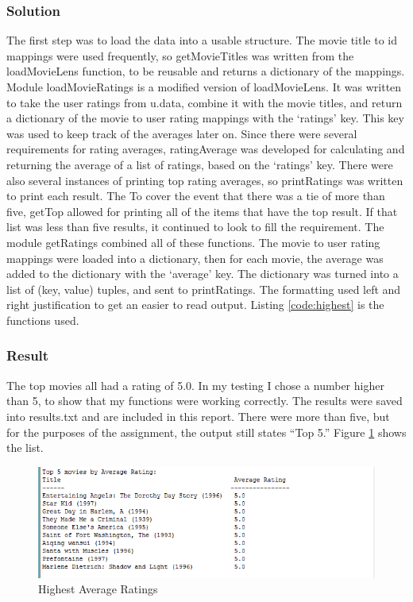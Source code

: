 \documentclass[paper=a4, fontsize=11pt]{scrartcl} %
\numberwithin{equation}{section} %
\numberwithin{figure}{section} %
\numberwithin{table}{section} %
\begin{document}
\subsubsection{Solution}
The first step was to load the data into a usable structure.
The movie title to id mappings were used frequently, so getMovieTitles was written from the loadMovieLens function, to be reusable and returns a dictionary of the mappings.
Module loadMovieRatings is a modified version of loadMovieLens.
It was written to take the user ratings from u.data, combine it with the movie titles, and return a dictionary of the movie to user rating mappings with the `ratings' key.\cite{bib:collective}
This key was used to keep track of the averages later on.
Since there were several requirements for rating averages, ratingAverage was developed for calculating and returning the average of a list of ratings, based on the `ratings' key.
There were also several instances of printing top rating averages, so printRatings was written to print each result.  
The 
To cover the event that there was a tie of more than five, getTop allowed for printing all of the items that have the top result. 
If that list was less than five results, it continued to look to fill the requirement.
The module getRatings combined all of these functions.
The movie to user rating mappings were loaded into a dictionary, then for each movie, the average was added to the dictionary with the `average' key.
The dictionary was turned into a list of (key, value) tuples, and sent to printRatings.\cite{bib:nested}
The formatting used left and right justification to get an easier to read output.\cite{bib:fancy}
Listing \ref{code:highest} is the functions used.\\



\subsubsection{Result}
The top movies all had a rating of 5.0.  
In my testing I chose a number higher than 5, to show that my functions were working correctly.
The results were saved into results.txt and are included in this report.
There were more than five, but for the purposes of the assignment, the output still states ``Top 5.''
Figure \ref{fig:average} shows the list.

\begin{figure}[H]
\includegraphics[width=1\textwidth]{pics/highestAverage}
\caption{Highest Average Ratings}
\label{fig:average}
\end{figure}
\end{document}
